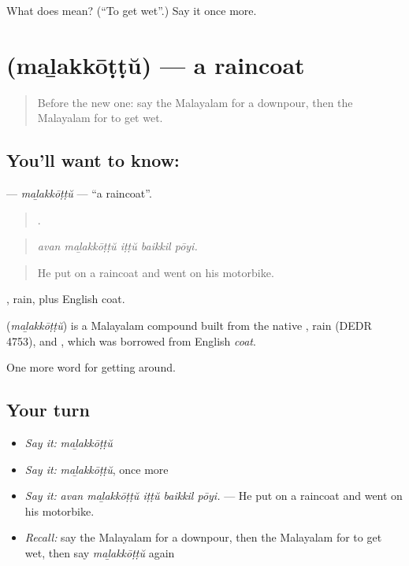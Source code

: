 \begin{tcolorbox}[breakable,colback=teal!4,colframe=teal!35!black,title={Before you move on}]
What does  mean? (\textquotedblleft{}To get wet\textquotedblright{}.) Say it once more.
\end{tcolorbox}
\section[\texorpdfstring{\ml{മഴക്കോട്ട്} (maḻakkōṭṭŭ)}{മഴക്കോട്ട് (maḻakkōṭṭŭ)}]{ (maḻakkōṭṭŭ) — a raincoat}

\label{lesson:ML-C508-malakkottu}



\begin{quote}
Before the new one: say the Malayalam for a downpour, then the Malayalam for to get wet.
\end{quote}

\subsection*{You'll want to know: }
\textbf{} — \emph{maḻakkōṭṭŭ} — \textquotedblleft{}a raincoat\textquotedblright{}.

\begin{quote}
    .
\end{quote}

\begin{quote}
\emph{avan maḻakkōṭṭŭ iṭṭŭ baikkil pōyi.}
\end{quote}

\begin{quote}
He put on a raincoat and went on his motorbike.
\end{quote}

, rain, plus English coat.

\begin{cousinweb}
\textbf{} (\emph{maḻakkōṭṭŭ}) is a Malayalam compound built from the native , rain (DEDR 4753), and , which was borrowed from English \emph{coat}.
\end{cousinweb}

\begin{grammarlens}[title={What you've built}]
One more word for getting around.
\end{grammarlens}

\subsection*{Your turn}
\begin{itemize}
\raggedright
  \item \emph{Say it:} \emph{maḻakkōṭṭŭ}
  \item \emph{Say it:} \emph{maḻakkōṭṭŭ}, once more
  \item \emph{Say it:} \emph{avan maḻakkōṭṭŭ iṭṭŭ baikkil pōyi.} — He put on a raincoat and went on his motorbike.
  \item \emph{Recall:} say the Malayalam for a downpour, then the Malayalam for to get wet, then say \emph{maḻakkōṭṭŭ} again
\end{itemize}

